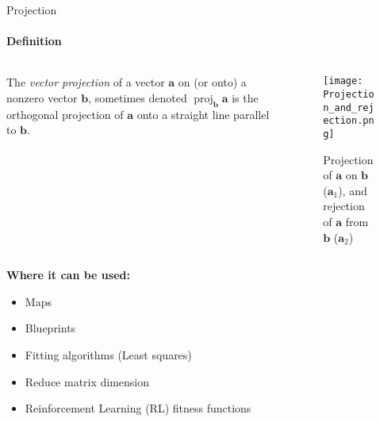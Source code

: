\documentclass[aspectratio=169]{beamer}
\begin{document}
\begin{frame}[t]{Projection}
    \framesubtitle{Definition}
    \vspace{-0.3cm}
    \begin{columns}[T,onlytextwidth]
        \begin{column}{0.5\textwidth}
            The \textit{vector projection} of a vector $\mathbf {a}$ on (or onto) a nonzero vector $\mathbf {b}$, sometimes denoted $\operatorname {proj} _{\mathbf {b} }\mathbf {a}$  is the orthogonal projection of $\mathbf {a}$ onto a straight line parallel to $\mathbf {b}$.
        \end{column}
        \begin{column}{0.49\textwidth}
            \vspace{-1cm}
            \begin{figure}[H]
                \centering\texttt{[image: Projection\_and\_rejection.png]}
                \caption*{Projection of $\mathbf{a}$ on $\mathbf{b}$ ($\mathbf{a}_1$), and rejection of $\mathbf{a}$ from $\mathbf{b}$ ($\mathbf{a}_2$)}
                \label{fig:Projection_and_rejection.png}
            \end{figure}
        \end{column}
    \end{columns}
    \textbf{Where it can be used:}
    \vspace{-0.5cm}
    \begin{multicols}{2}
        \begin{itemize}
            \item Maps
            \item Blueprints
            \item Fitting algorithms (Least squares)
            \item Reduce matrix dimension
            \item Reinforcement Learning (RL) fitness functions
        \end{itemize}
    \end{multicols}
\end{frame}
\end{document}
